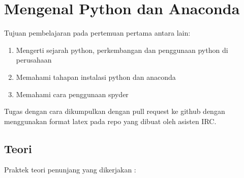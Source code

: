 \chapter{Mengenal Python dan Anaconda}
Tujuan pembelajaran pada pertemuan pertama antara lain:
\begin{enumerate}
\item
Mengerti sejarah python, perkembangan dan penggunaan python di perusahaan
\item
Memahami tahapan instalasi python dan anaconda
\item
Memahami cara penggunaan spyder
\end{enumerate}
Tugas dengan cara dikumpulkan dengan pull request ke github dengan menggunakan format latex pada repo yang dibuat oleh asisten IRC.

\section{Teori}
Praktek teori penunjang yang dikerjakan :
